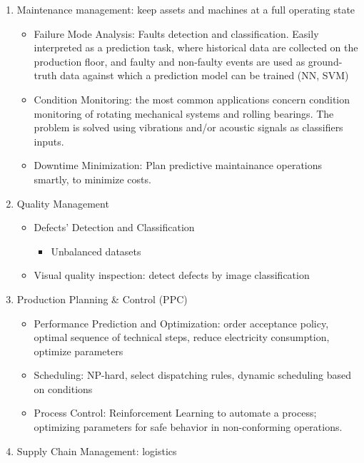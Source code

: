 \documentclass[
  letterpaper,
  DIV=11,
  numbers=noendperiod]{scrartcl}
\providecommand{\tightlist}{%
  \setlength{\itemsep}{0pt}\setlength{\parskip}{0pt}}\usepackage{longtable,booktabs,array}
\begin{document}
\begin{enumerate}
\def\labelenumi{\arabic{enumi}.}
\tightlist
\item
  Maintenance management: keep assets and machines at a full operating
  state

  \begin{itemize}
  \tightlist
  \item
    Failure Mode Analysis: Faults detection and classification. Easily
    interpreted as a prediction task, where historical data are
    collected on the production floor, and faulty and non-faulty events
    are used as ground-truth data against which a prediction model can
    be trained (NN, SVM)
  \item
    Condition Monitoring: the most common applications concern condition
    monitoring of rotating mechanical systems and rolling bearings. The
    problem is solved using vibrations and/or acoustic signals as
    classifiers inputs.
  \item
    Downtime Minimization: Plan predictive maintainance operations
    smartly, to minimize costs.
  \end{itemize}
\item
  Quality Management

  \begin{itemize}
  \tightlist
  \item
    Defects' Detection and Classification

    \begin{itemize}
    \tightlist
    \item
      Unbalanced datasets
    \end{itemize}
  \item
    Visual quality inspection: detect defects by image classification
  \end{itemize}
\item
  Production Planning \& Control (PPC)

  \begin{itemize}
  \tightlist
  \item
    Performance Prediction and Optimization: order acceptance policy,
    optimal sequence of technical steps, reduce electricity consumption,
    optimize parameters
  \item
    Scheduling: NP-hard, select dispatching rules, dynamic scheduling
    based on conditions
  \item
    Process Control: Reinforcement Learning to automate a process;
    optimizing parameters for safe behavior in non-conforming
    operations.
  \end{itemize}
\item
  Supply Chain Management: logistics


\end{enumerate}
\end{document}

